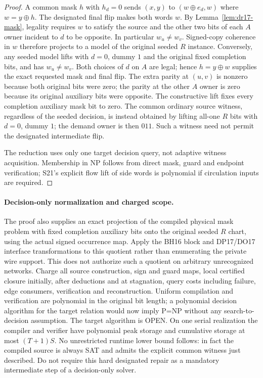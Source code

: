 \documentclass[11pt]{article}
\begin{document}
\begin{proof}
A common mask $h$ with $h_d=0$ sends $(x,y)$ to $(w\oplus e_d,w)$ where $w=y\oplus h$. The designated final flip makes both words $w$. By Lemma~\ref{lem:dr17-mask}, legality requires $w$ to satisfy the source and the other two bits of each $A$ owner incident to $d$ to be opposite. In particular $w_u\ne w_v$. Signed-copy coherence in $w$ therefore projects to a model of the original seeded $R$ instance. Conversely, any seeded model lifts with $d=0$, dummy $1$ and the original fixed completion bits, and has $w_u\ne w_v$. Both choices of $d$ on $A$ are legal; hence $h=y\oplus w$ supplies the exact requested mask and final flip. The extra parity at $(u,v)$ is nonzero because both original bits were zero; the parity at the other $A$ owner is zero because its original auxiliary bits were opposite. The constructive lift fixes every completion auxiliary mask bit to zero. The common ordinary source witness, regardless of the seeded decision, is instead obtained by lifting all-one $R$ bits with $d=0$, dummy $1$; the demand owner is then $011$. Such a witness need not permit the designated intermediate flip.

The reduction uses only one target decision query, not adaptive witness acquisition. Membership in NP follows from direct mask, guard and endpoint verification; S21's explicit flow lift of side words is polynomial if circulation inputs are required.
\end{proof}

\paragraph{Decision-only normalization and charged scope.}
The proof also supplies an exact projection of the compiled physical mask problem with fixed completion auxiliary bits onto the original seeded $R$ chart, using the actual signed occurrence map. Apply the BH16 block and DP17/DO17 interface transformations to this quotient rather than enumerating the private wire support. This does not authorize such a quotient on arbitrary unrecognized networks. Charge all source construction, sign and guard maps, local certified closure initially, after deductions and at stagnation, query costs including failure, edge consumers, verification and reconstruction. Uniform compilation and verification are polynomial in the original bit length; a polynomial decision algorithm for the target relation would now imply P=NP without any search-to-decision assumption. The target algorithm is OPEN. On one serial realization the compiler and verifier have polynomial peak storage and cumulative storage at most $(T+1)S$. No unrestricted runtime lower bound follows: in fact the compiled source is always SAT and admits the explicit common witness just described. Do not require this hard designated repair as a mandatory intermediate step of a decision-only solver.
\end{document}
